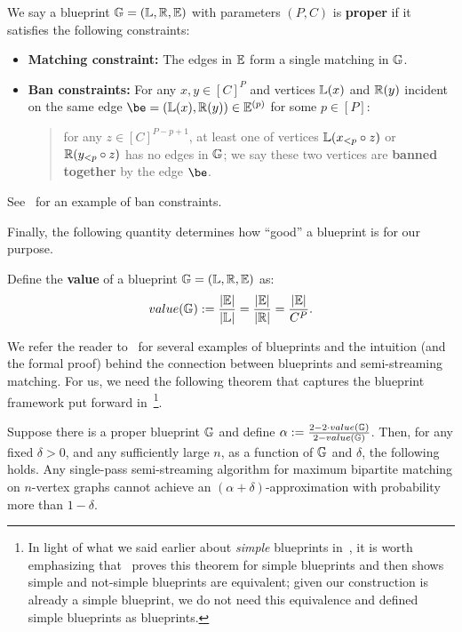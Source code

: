 \begin{definition}\label{def:proper-blueprint}
	We say a blueprint $\mathbb{G}=(\mathbb{L},\mathbb{R},\mathbb{E})$ with parameters $(P,C)$ is \textbf{proper} if it satisfies the following constraints:
    \begin{itemize}
        \item \textnormal{\textbf{Matching constraint:}} The edges in $\mathbb{E}$ form a single matching in $\mathbb{G}$. 

        \item \textnormal{\textbf{Ban constraints:}} For any $x,y \in [C]^P$ and vertices $\mathbb{L}(x)$ and $\mathbb{R}(y)$ incident on the same edge $\be=(\bL(x),\bR(y)) \in \bEE{p}$ for some $p \in [P]$:
	\begin{quote}
		for any $z \in [C]^{P-p+1}$, at least one of vertices $\mathbb{L}(x_{<p} \circ z)$ or $\mathbb{R}(y_{<p} \circ z)$ has no edges in $\mathbb{G}$; we
		say these two vertices are \textbf{banned together} by the edge $\be$.
	\end{quote}
    \end{itemize}
\end{definition}
See~ for an example of ban constraints.



Finally, the following quantity determines how ``good'' a blueprint is for our purpose.
\begin{definition}\label{def:blueprint-value-approx}
	Define the \textnormal{\textbf{value}} of a blueprint $\mathbb{G} = (\mathbb{L},\mathbb{R},\mathbb{E})$ as:
 	 \[
    		value(\mathbb{G}) := \frac{\left\vert{\mathbb{E}}\right\vert}{\left\vert{\mathbb{L}}\right\vert} = \frac{\left\vert{\mathbb{E}}\right\vert}{\left\vert{\mathbb{R}}\right\vert} = \frac{\left\vert{\mathbb{E}}\right\vert}{C^P}. 
    	\]
\end{definition}

We refer the reader to~\cite{AssadiJX26} for several examples of blueprints and the intuition (and the formal proof) behind the connection between blueprints and semi-streaming matching. For us, we need the following 
theorem that captures the blueprint framework put forward in~\cite{AssadiJX26}\footnote{In light of what we said earlier about \emph{simple} blueprints in~\cite{AssadiJX26}, it is worth 
emphasizing that~\cite{AssadiJX26} proves this theorem for simple blueprints and then shows simple and not-simple blueprints are equivalent; given our construction is already a simple blueprint, we 
do not need this equivalence and defined simple blueprints as blueprints.}.

\begin{theorem}\label{thm:framework}
	Suppose there is a proper blueprint $\mathbb{G}$ and define $\alpha := \frac{2-2 \cdot value(\mathbb{G})}{2-value(\mathbb{G})}$. 
	Then, for any fixed $\delta > 0$, and any sufficiently large $n$, as a function of $\mathbb{G}$ and $\delta$, the following holds. 
	Any single-pass semi-streaming algorithm for maximum bipartite matching on $n$-vertex graphs cannot achieve
	an $(\alpha+\delta)$-approximation with probability more than $1-\delta$. 
\end{theorem}

